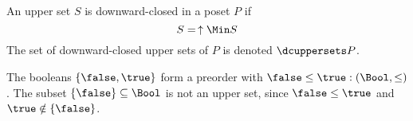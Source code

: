 \begin{definition}
\label{def:downward-closed-upperset}
An upper set $S$ is downward-closed in a poset $P$ if
\begin{equation}
    S =\, \uparrow \Min S
\end{equation}
The set of downward-closed upper sets of $P$ is denoted $\dcuppersets P$.
\end{definition}

\begin{example}
The booleans $\{\false, \true \}$ form a preorder with $\false \leq \true:(\Bool,\leq)$ . The subset $\{\false\} \subseteq \Bool$ is not an upper set, since $\false \leq \true$ and $\true \notin \{\false \}$.	
\end{example}

